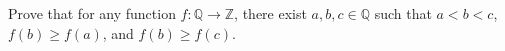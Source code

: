 Prove that for any function \(f \colon \mathbb{Q} \to \mathbb{Z}\), there exist \(a, b, c \in \mathbb{Q}\) such that \(a < b < c\), \(f(b) \ge f(a)\), and \(f(b) \ge f(c)\).
